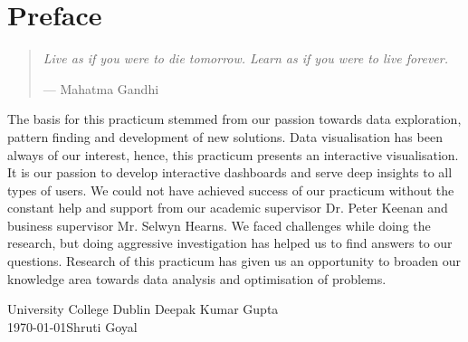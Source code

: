 %
%
%
%

\chapter*{Preface}


\begin{quote}
\noindent\textit{Live as if you were to die tomorrow. Learn as if you were to live forever.}

\hspace{2cm}--- Mahatma Gandhi
\end{quote}

The basis for this practicum stemmed from our passion towards data exploration, pattern finding and development of new solutions. Data visualisation has been always of our interest, hence, this practicum presents an interactive visualisation. It is our passion to develop interactive dashboards and serve deep insights to all types of users. We could not have achieved success of our practicum without the constant help and support from our academic supervisor Dr. Peter Keenan and business supervisor Mr. Selwyn Hearns. We faced challenges while doing the research, but doing aggressive investigation has helped us to find answers to our questions. Research of this practicum has given us an opportunity to broaden our knowledge area towards data analysis and optimisation of problems. 

\vspace{2em}

University College Dublin \hfill Deepak Kumar Gupta \\
\today \hfill Shruti Goyal
